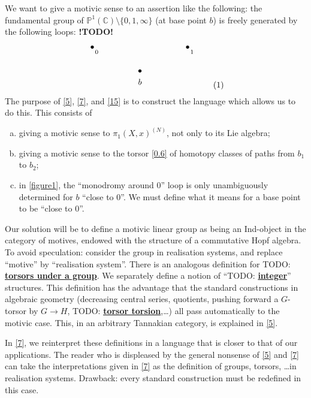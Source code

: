 \documentclass{article}
\theoremstyle{definition}
\newcommand{\bb}{\mathbb}
\newcommand{\PP}{\bb{P}}
\newcommand{\CC}{\bb{C}}
\newcommand{\unsure}[1]{TODO: \underline{\textbf{#1}}}
\newcommand{\todo}{\textbf{ !TODO! }}
\newcommand{\oldpage}[1]{\marginpar{\footnotesize$\Big\vert$ \textit{p.~#1}}}
\begin{document}
We want to give a motivic sense to an assertion like the following: the fundamental group of $\PP^1(\CC)\setminus\{0,1,\infty\}$ (at base point $b$) is freely generated by the following loops:
\todo
\[
\label{figure1}
  \begin{tikzpicture}
    \node[label=below:{$b$}] at (0,0) {$\bullet$};
    \node[label={[label distance=-3mm]below right:{\scriptsize$1$}}] at (2,1) {$\bullet$};
    \node[label={[label distance=-3mm]below right:{\scriptsize$0$}}] at (-2,1) {$\bullet$};
  \end{tikzpicture}
\tag{1}
\]
The purpose of \cref{5}, \cref{7}, and \cref{15} is to construct the language which allows us to do this.
This consists of
\begin{enumerate}[(a)]
  \item giving a motivic sense to $\pi_1(X,x)^{(N)}$, not only to its Lie algebra;
  \item giving a motivic sense to the torsor \cref{0.6} of homotopy classes of paths from $b_1$ to $b_2$;
  \item in \cref{figure1}, the ``monodromy around $0$'' loop is only unambiguously determined
\oldpage{85}
    for $b$ ``close to $0$''.
    We must define what it means for a base point to be ``close to $0$''.
\end{enumerate}

Our solution will be to define a motivic linear group as being an Ind-object in the category of motives, endowed with the structure of a commutative Hopf algebra.
To avoid speculation: consider the group in realisation systems, and replace ``motive'' by ``realisation system''.
There is an analogous definition for \unsure{torsors under a group}.
We separately define a notion of ``\unsure{integer}'' structures.
This definition has the advantage that the standard constructions in algebraic geometry (decreasing central series, quotients, pushing forward a $G$-torsor by $G\to H$, \unsure{torsor torsion},\ldots) all pass automatically to the motivic case.
This, in an arbitrary Tannakian category, is explained in \cref{5}.

In \cref{7}, we reinterpret these definitions in a language that is closer to that of our applications.
The reader who is displeased by the general nonsense of \cref{5} and \cref{7} can take the interpretations given in \cref{7} as the definition of groups, torsors, \ldots in realisation systems.
Drawback: every standard construction must be redefined in this case.
\end{document}
